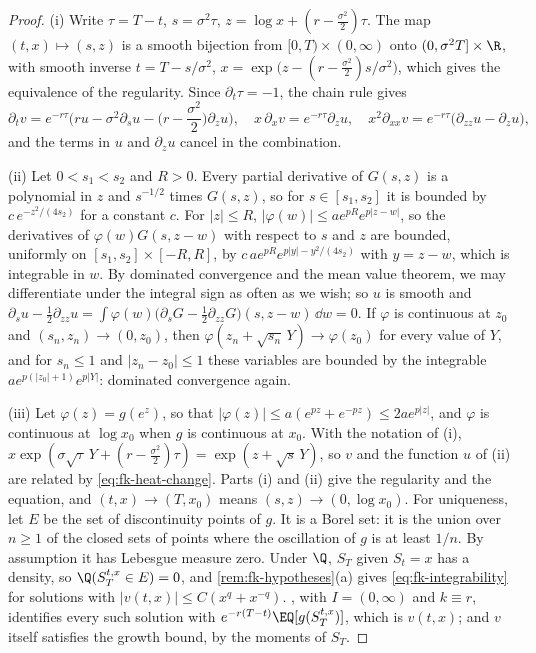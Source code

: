 \begin{proof}
(i) Write $\tau=T-t$, $s=\sigma^2\tau$, $z=\log x+(r-\frac{\sigma^2}{2})\tau$. The map
$(t,x)\mapsto(s,z)$ is a smooth bijection from $[0,T)\times(0,\infty)$ onto $(0,\sigma^2T]\times\R$, with
smooth inverse $t=T-s/\sigma^2$, $x=\exp\big(z-(r-\frac{\sigma^2}2)s/\sigma^2\big)$, which gives the
equivalence of the regularity. Since $\partial_t\tau=-1$, the chain rule gives
\[
  \partial_tv=e^{-r\tau}\Big(ru-\sigma^2\partial_su-\Big(r-\frac{\sigma^2}{2}\Big)\partial_zu\Big),\quad
  x\,\partial_xv=e^{-r\tau}\partial_zu,\quad
  x^2\partial_{xx}v=e^{-r\tau}\big(\partial_{zz}u-\partial_zu\big),
\]
and the terms in $u$ and $\partial_zu$ cancel in the combination.

(ii) Let $0<s_1<s_2$ and $R>0$. Every partial derivative of $G(s,z)$ is a polynomial in $z$ and
$s^{-1/2}$ times $G(s,z)$, so for $s\in[s_1,s_2]$ it is bounded by
$c\,e^{-z^2/(4s_2)}$ for a constant $c$. For $|z|\le R$, $|\varphi(w)|\le ae^{pR}e^{p|z-w|}$, so the
derivatives of $\varphi(w)G(s,z-w)$ with respect to $s$ and $z$ are bounded, uniformly on
$[s_1,s_2]\times[-R,R]$, by $c\,ae^{pR}e^{p|y|-y^2/(4s_2)}$ with $y=z-w$, which is integrable in $w$.
By dominated convergence and the mean value theorem, we may differentiate under the integral sign
as often as we wish; so $u$ is smooth and $\partial_su-\frac12\partial_{zz}u=\int\varphi(w)
\big(\partial_sG-\frac12\partial_{zz}G\big)(s,z-w)\,\dd w=0$. If $\varphi$ is continuous at $z_0$
and $(s_n,z_n)\to(0,z_0)$, then $\varphi(z_n+\sqrt{s_n}\,Y)\to\varphi(z_0)$ for every value of $Y$, and
for $s_n\le1$ and $|z_n-z_0|\le1$ these variables are bounded by the integrable
$ae^{p(|z_0|+1)}e^{p|Y|}$: dominated convergence again.

(iii) Let $\varphi(z)=g(e^z)$, so that $|\varphi(z)|\le a(e^{pz}+e^{-pz})\le2ae^{p|z|}$, and $\varphi$ is
continuous at $\log x_0$ when $g$ is continuous at $x_0$. With the notation of (i),
$x\exp(\sigma\sqrt\tau\,Y+(r-\frac{\sigma^2}{2})\tau)=\exp(z+\sqrt s\,Y)$, so $v$ and the function $u$ of
(ii) are related by \eqref{eq:fk-heat-change}. Parts (i) and (ii) give the regularity and the
equation, and $(t,x)\to(T,x_0)$ means $(s,z)\to(0,\log x_0)$. For uniqueness, let $E$ be the set of
discontinuity points of $g$. It is a Borel set: it is the union over $n\ge1$ of the closed sets of
points where the oscillation of $g$ is at least $1/n$. By assumption it has Lebesgue measure zero. Under $\Q$, $S_T$
given $S_t=x$ has a density, so $\Q(S^{t,x}_T\in E)=0$, and \cref{rem:fk-hypotheses}(a) gives
\eqref{eq:fk-integrability} for solutions with $|v(t,x)|\le C(x^q+x^{-q})$.
, with $I=(0,\infty)$ and $k\equiv r$, identifies every such solution
with $e^{-r(T-t)}\EQ[g(S^{t,x}_T)]$, which is $v(t,x)$; and $v$ itself satisfies the growth bound,
by the moments of $S_T$.
\end{proof}

